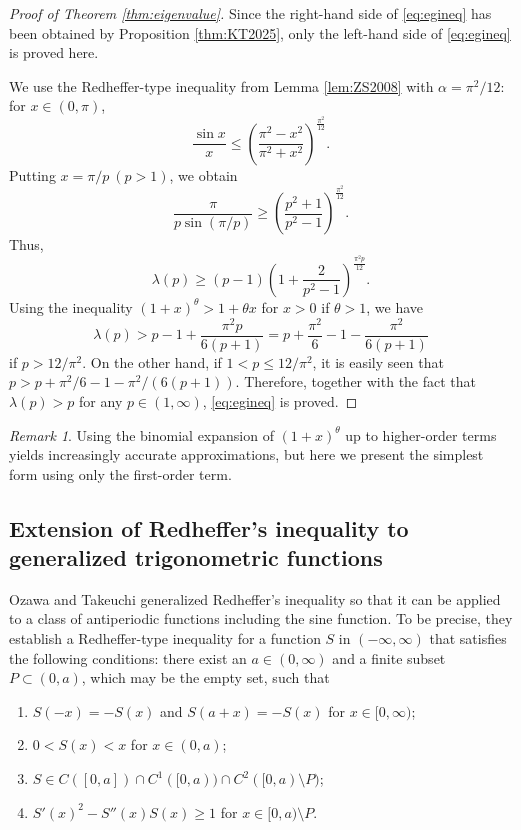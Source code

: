 \documentclass[12pt]{amsart}
\numberwithin{equation}{section}
\theoremstyle{plain}
\theoremstyle{definition}
\theoremstyle{remark}
\newtheorem{rem}[thm]{Remark}
\begin{document}
\begin{proof}[Proof of Theorem \ref{thm:eigenvalue}]
Since the right-hand side of \eqref{eq:egineq} 
has been obtained by Proposition \ref{thm:KT2025}, 
only the left-hand side of \eqref{eq:egineq} is proved here.

We use the Redheffer-type inequality from Lemma \ref{lem:ZS2008} with $\alpha=\pi^2/12$:
for $x \in (0,\pi)$,
\[\frac{\sin{x}}{x} \leq \left(\frac{\pi^2-x^2}{\pi^2+x^2}\right)^{\frac{\pi^2}{12}}.\]
Putting $x=\pi/p\ (p>1)$, we obtain
\[\frac{\pi}{p\sin{(\pi/p)}}
\geq \left(\frac{p^2+1}{p^2-1}\right)^{\frac{\pi^2}{12}}.\]
Thus,
\[\lambda(p) \geq (p-1)
\left(1+\frac{2}{p^2-1}\right)^{\frac{\pi^2p}{12}}.\]
Using the inequality $(1+x)^\theta>1+\theta x$ for $x>0$ if $\theta>1$, 
we have
\[\lambda(p)> p-1+\frac{\pi^2p}{6(p+1)}
=p+\frac{\pi^2}{6}-1-\frac{\pi^2}{6(p+1)}\]
if $p>12/\pi^2$.
On the other hand, if $1< p \leq 12/\pi^2$, it is easily seen that $p > p + \pi^2/6 - 1-\pi^2/(6(p+1))$. Therefore, together with the fact that $\lambda(p) > p$ for any $p \in (1,\infty)$, \eqref{eq:egineq} is proved.
\end{proof}

\begin{rem}
Using the binomial expansion of $(1+x)^\theta$ 
up to higher-order terms yields increasingly accurate approximations, but here we present the simplest form using only the first-order term.
\end{rem}

\subsection{Extension of Redheffer's inequality to generalized trigonometric functions}

Ozawa and Takeuchi \cite{OT2021} 
generalized Redheffer's inequality so that it can be applied 
to a class of antiperiodic functions including the sine function.
To be precise, they establish a Redheffer-type inequality for a 
function $S$ in $(-\infty,\infty)$ that satisfies the following conditions:
there exist an $a \in (0,\infty)$ and a finite subset 
$P \subset (0,a)$, which may be the empty set, such that
\begin{enumerate}
\item[(S1)] $S(-x)=-S(x)$ and $S(a+x)=-S(x)$ for $x \in [0,\infty)$;
\item[(S2)] $0<S(x)<x$ for $x \in (0,a)$;
\item[(S3)] $S \in C([0,a]) \cap C^1([0,a)) \cap C^2([0,a) \setminus P)$;
\item[(S4)] $S'(x)^2-S''(x)S(x) \geq 1$ for $x \in [0,a) \setminus P$.
\end{enumerate}
\end{document}
